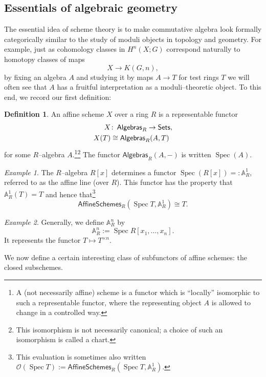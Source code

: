 \documentclass{amsart}
\newcommand{\<}{\langle}
\renewcommand{\>}{\rangle}
\newcommand{\co}{\colon\thinspace}
\newcommand{\CatOf}[1]{\mathsf{#1}}
\newcommand{\sheaf}[1]{\mathcal{#1}}
\DeclareMathOperator{\Spec}{Spec}
\theoremstyle{plain}
\theoremstyle{definition}
\newtheorem*{definition}{Definition}
\theoremstyle{remark}
\newtheorem*{example}{Example}
\begin{document}
\subsection{Essentials of algebraic geometry}

The essential idea of scheme theory is to make commutative algebra look formally categorically similar to the study of moduli objects in topology and geometry.  For example, just as cohomology classes in $H^n(X; G)$ correspond naturally to homotopy classes of maps \[X \to K(G, n),\] by fixing an algebra $A$ and studying it by maps $A \to T$ for test rings $T$ we will often see that $A$ has a fruitful interpretation as a moduli--theoretic object.  To this end, we record our first definition:

\begin{definition}\label{AffineScheme}
An affine scheme $X$ over a ring $R$ is a representable functor
\begin{align*}
X & \co \CatOf{Algebras}_R \to \CatOf{Sets}, \\
X(T) & \cong \CatOf{Algebras}_R(A, T)
\end{align*}
for some $R$--algebra $A$.\footnote{A (not necessarily affine) scheme is a functor which is ``locally'' isomorphic to such a representable functor, where the representing object $A$ is allowed to change in a controlled way.}\footnote{This isomorphism is not necessarily canonical; a choice of such an isomorphism is called a chart.}  The functor $\CatOf{Algebras}_R(A, -)$ is written $\Spec(A)$.
\end{definition}

\begin{example}\label{A1Example}
The $R$--algebra $R[x]$ determines a functor $\Spec(R[x]) =: \mathbb A^1_R$, referred to as the affine line (over $R$).  This functor has the property that $\mathbb A^1_R(T) = T$ and hence that\footnote{This evaluation is sometimes also written $\sheaf{O}(\Spec T) := \CatOf{AffineSchemes}_R(\Spec T, \mathbb A^1_R)$.} \[\CatOf{AffineSchemes}_R(\Spec T, \mathbb A^1_R) \cong T.\]
\end{example}

\begin{example}
Generally, we define $\mathbb A^n_R$ by \[\mathbb A^n_R := \Spec R[x_1, \ldots, x_n].\]  It represents the functor $T \mapsto T^{\times n}$.
\end{example}

We now define a certain interesting class of subfunctors of affine schemes: the closed subschemes.
\end{document}
